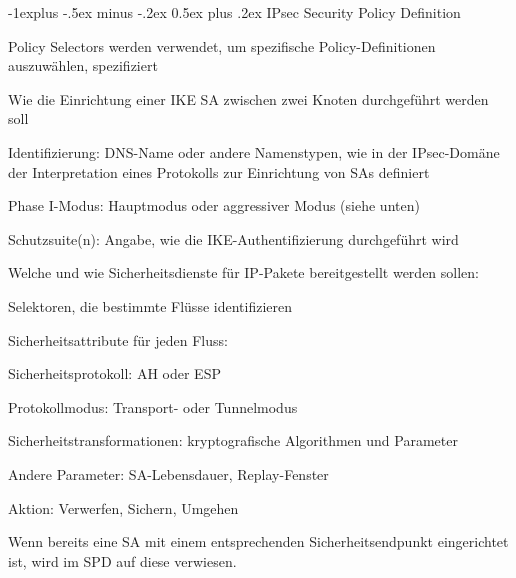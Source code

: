 \documentclass[a4paper]{article}
\makeatletter
\renewcommand{\subsection}{\@startsection{subsection}{2}{0mm}%
 {-1explus -.5ex minus -.2ex}%
 {0.5ex plus .2ex}%
 {\normalfont\normalsize\bfseries}}
\makeatother
\begin{document}
\begin{multicols}{3}
      \subsection{IPsec Security Policy Definition}
      \begin{itemize*}
            \item Policy Selectors werden verwendet, um spezifische Policy-Definitionen auszuwählen, spezifiziert
            \item Wie die Einrichtung einer IKE SA zwischen zwei Knoten durchgeführt werden soll
            \begin{itemize*}
                  \item Identifizierung: DNS-Name oder andere Namenstypen, wie in der IPsec-Domäne der Interpretation eines Protokolls zur Einrichtung von SAs definiert
                  \item Phase I-Modus: Hauptmodus oder aggressiver Modus (siehe unten)
                  \item Schutzsuite(n): Angabe, wie die IKE-Authentifizierung durchgeführt wird
            \end{itemize*}
            \item Welche und wie Sicherheitsdienste für IP-Pakete bereitgestellt werden sollen:
            \begin{itemize*}
                  \item Selektoren, die bestimmte Flüsse identifizieren
                  \item Sicherheitsattribute für jeden Fluss:
                  \item Sicherheitsprotokoll: AH oder ESP
                  \item Protokollmodus: Transport- oder Tunnelmodus
                  \item Sicherheitstransformationen: kryptografische Algorithmen und Parameter
                  \item Andere Parameter: SA-Lebensdauer, Replay-Fenster
                  \item Aktion: Verwerfen, Sichern, Umgehen
            \end{itemize*}
            \item Wenn bereits eine SA mit einem entsprechenden Sicherheitsendpunkt eingerichtet ist, wird im SPD auf diese verwiesen.
      \end{itemize*}


\end{multicols}
\end{document}
